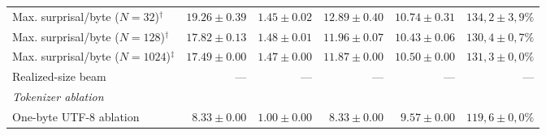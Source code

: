 \begin{table}[t]
\begin{tabular}{lrrrrr}
Max. surprisal/byte ($N=32$)$^\dagger$
    & $19.26 \pm 0.39$
    & $1.45 \pm 0.02$
    & $12.89 \pm 0.40$
    & $10.74 \pm 0.31$
    & $134{,}2 \pm 3{,}9\%$ \\

Max. surprisal/byte ($N=128$)$^\dagger$
    & $17.82 \pm 0.13$
    & $1.48 \pm 0.01$
    & $11.96 \pm 0.07$
    & $10.43 \pm 0.06$
    & $130{,}4 \pm 0{,}7\%$ \\

Max. surprisal/byte ($N=1024$)$^\ddagger$
    & $17.49 \pm 0.00$
    & $1.47 \pm 0.00$
    & $11.87 \pm 0.00$
    & $10.50 \pm 0.00$
    & $131{,}3 \pm 0{,}0\%$ \\

Realized-size beam
    & --- & --- & --- & --- & --- \\

\midrule

\multicolumn{6}{l}{\textit{Tokenizer ablation}} \\

One-byte UTF-8 ablation
    & $8.33 \pm 0.00$
    & $1.00 \pm 0.00$
    & $8.33 \pm 0.00$
    & $9.57 \pm 0.00$
    & $119{,}6 \pm 0{,}0\%$ \\

\bottomrule

\end{tabular}

\end{table}